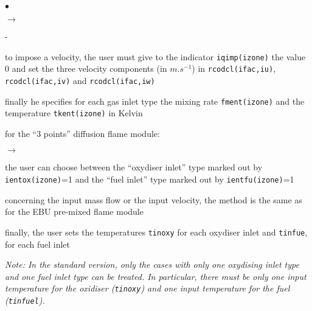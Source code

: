 {{{\begin{list}{$\bullet$}{}
\begin{list}{$\rightarrow$}{}
\begin{list}{-}{}
                                 \item to impose a velocity, the user
                                       must give to the indicator
                                       \texttt{iqimp(izone)} the value 0 and set
                                       the three velocity components (in
                                       $m.s^{-1}$) in
                                       \texttt{rcodcl(ifac,iu)},
                                       \texttt{rcodcl(ifac,iv)} and
                                       \texttt{rcodcl(ifac,iw)}
                          \end{list}
                    \item finally he specifies for each gas inlet type
                          the mixing rate \texttt{fment(izone)} and
                          the temperature \texttt{tkent(izone)} in Kelvin
             \end{list}

       \item for the ``3 points'' diffusion flame module:
             \begin{list}{$\rightarrow$}{}
                    \item the user can choose between the ``oxydiser
                          inlet'' type marked out by
                          \texttt{ientox(izone)}=1 and the ``fuel
                          inlet'' type marked out by
                          \texttt{ientfu(izone)}=1
                    \item concerning the input mass flow or the input
                          velocity, the method is the same as for the
                          EBU pre-mixed flame module
                    \item finally, the user sets the temperatures
                          \texttt{tinoxy} for each oxydiser inlet
                          and \texttt{tinfue}, for each fuel inlet

{\em Note: In the standard version, only the cases with only one
                          oxydising inlet type and one fuel inlet type
                          can be treated. In particular, there must be
                          only one input temperature for the oxidiser
                          (\texttt{tinoxy}) and one input temperature for the
                          fuel (\texttt{tinfuel}).}
             \end{list}


\end{list}}}}
